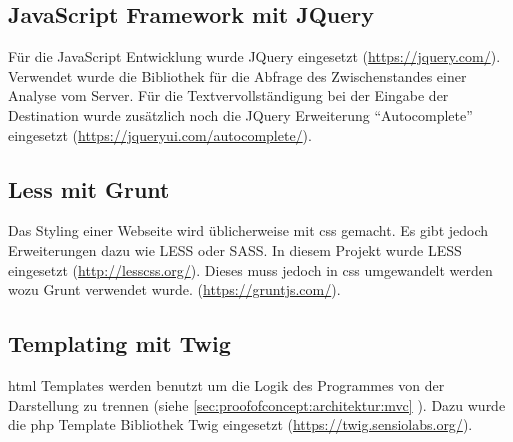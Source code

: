 \subsection{JavaScript Framework mit JQuery}
Für die JavaScript Entwicklung wurde JQuery eingesetzt (\url{https://jquery.com/}). Verwendet wurde die Bibliothek für die Abfrage des Zwischenstandes einer Analyse vom Server. Für die Textvervollständigung bei der Eingabe der Destination wurde zusätzlich noch die JQuery Erweiterung "`Autocomplete"' eingesetzt (\url{https://jqueryui.com/autocomplete/}).

\subsection{Less mit Grunt}
Das Styling einer Webseite wird üblicherweise mit \gls{css} gemacht. Es gibt jedoch Erweiterungen dazu wie LESS oder SASS. In diesem Projekt wurde LESS eingesetzt (\url{http://lesscss.org/}). Dieses muss jedoch in \gls{css} umgewandelt werden wozu Grunt verwendet wurde. (\url{https://gruntjs.com/}).

\subsection{Templating mit Twig}
\label{sec:proofofconcept:externebibliotheken:twig}
\gls{html} Templates werden benutzt um die Logik des Programmes von der Darstellung zu trennen (siehe \cref{sec:proofofconcept:architektur:mvc} ). Dazu wurde die \gls{php} Template Bibliothek Twig eingesetzt (\url{https://twig.sensiolabs.org/}).

